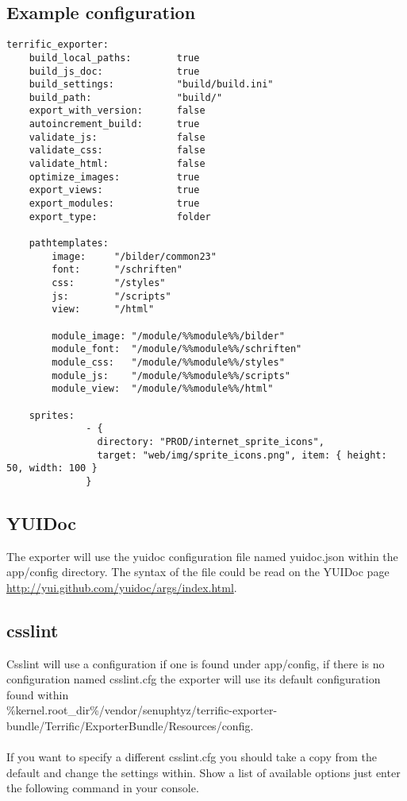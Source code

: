 \newpage
\subsection{Example configuration}

\begin{verbatim}
terrific_exporter:
	build_local_paths:        true
	build_js_doc:             true
	build_settings:           "build/build.ini"
	build_path:               "build/"
	export_with_version:      false
	autoincrement_build:      true
	validate_js:              false
	validate_css:             false
	validate_html:            false
	optimize_images:          true
	export_views:             true
	export_modules:           true
	export_type:              folder

	pathtemplates:
        image:     "/bilder/common23"
        font:      "/schriften"
        css:       "/styles"
        js:        "/scripts"
        view:      "/html"

        module_image: "/module/%%module%%/bilder"
        module_font:  "/module/%%module%%/schriften"
        module_css:   "/module/%%module%%/styles"
        module_js:    "/module/%%module%%/scripts"
        module_view:  "/module/%%module%%/html"

	sprites:
              - {
                directory: "PROD/internet_sprite_icons",
                target: "web/img/sprite_icons.png", item: { height: 50, width: 100 }
              }

\end{verbatim}

\subsection{YUIDoc}
The exporter will use the yuidoc configuration file named yuidoc.json within the app/config directory. The syntax of the file could be read on the YUIDoc page \url{http://yui.github.com/yuidoc/args/index.html}.

\subsection{csslint}
Csslint will use a configuration if one is found under app/config, if there is no configuration named csslint.cfg the exporter will use its default configuration found within\\
\%kernel.root\_dir\%/vendor/senuphtyz/terrific-exporter-bundle/Terrific/ExporterBundle/Resources/config. \\
\\
If you want to specify a different csslint.cfg you should take a copy from the default and change the settings within. Show a list of available options just enter the following command in your console.

